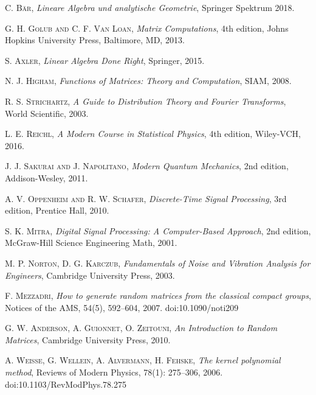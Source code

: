 
\begin{thebibliography}{56}

    \textsc{C. Bär},
    \textit{Lineare Algebra und analytische Geometrie},
    Springer Spektrum
    2018.

    \textsc{G. H. Golub and C. F. Van Loan},
    \textit{Matrix Computations},
    4th edition,
    Johns Hopkins University Press,
    Baltimore, MD,
    2013.

    \textsc{S. Axler},
    \textit{Linear Algebra Done Right},
    Springer,
    2015.

    \textsc{N. J. Higham},
    \textit{Functions of Matrices: Theory and Computation},
    SIAM,
    2008.

    \textsc{R. S. Strichartz},
    \textit{A Guide to Distribution Theory and Fourier Transforms},
    World Scientific,
    2003.

    \textsc{L. E. Reichl},
    \textit{A Modern Course in Statistical Physics},
    4th edition,
    Wiley-VCH,
    2016.

    \textsc{J. J. Sakurai and J. Napolitano},
    \textit{Modern Quantum Mechanics},
    2nd edition,
    Addison-Wesley,
    2011.

    \textsc{A. V. Oppenheim and R. W. Schafer},
    \textit{Discrete-Time Signal Processing},
    3rd edition,
    Prentice Hall,
    2010.

    \textsc{S. K. Mitra},
    \textit{Digital Signal Processing: A Computer-Based Approach},
    2nd edition,
    McGraw-Hill Science Engineering Math,
    2001.

    \textsc{M. P. Norton, D. G. Karczub},
    \textit{Fundamentals of Noise and Vibration Analysis for Engineers},
    Cambridge University Press,
    2003.

    \textsc{F. Mezzadri},
    \textit{How to generate random matrices from the classical compact groups},
    Notices of the AMS, 54(5), 592--604, 2007.
    doi:10.1090/noti209

    \textsc{G. W. Anderson, A. Guionnet, O. Zeitouni},
    \textit{An Introduction to Random Matrices},
    Cambridge University Press,
    2010.

    \textsc{A. Weisse, G. Wellein, A. Alvermann, H. Fehske},
    \textit{The kernel polynomial method},
    Reviews of Modern Physics, 78(1): 275--306, 2006.
    doi:10.1103/RevModPhys.78.275


\end{thebibliography}
